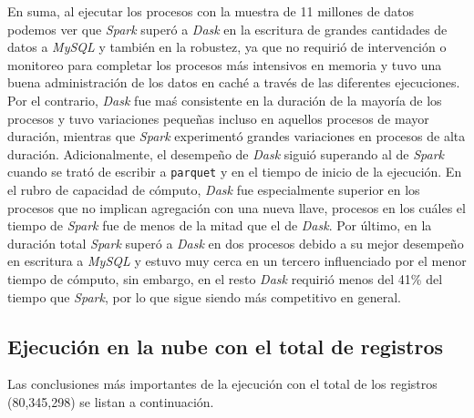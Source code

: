 En suma, al ejecutar los procesos con la muestra de 11 millones de datos podemos ver que \textit{Spark} superó a \textit{Dask} en la escritura de grandes cantidades de datos a \textit{MySQL} y también en la robustez, ya que no requirió de intervención o monitoreo para completar los procesos más intensivos en memoria y tuvo una buena administración de los datos en caché a través de las diferentes ejecuciones. Por el contrario, \textit{Dask} fue maś consistente en la duración de la mayoría de los procesos y tuvo variaciones pequeñas incluso en aquellos procesos de mayor duración, mientras que \textit{Spark} experimentó grandes variaciones en procesos de alta duración. Adicionalmente, el desempeño de \textit{Dask} siguió superando al de \textit{Spark} cuando se trató de escribir a \texttt{parquet} y en el tiempo de inicio de la ejecución. En el rubro de capacidad de cómputo, \textit{Dask} fue especialmente superior en los procesos que no implican agregación con una nueva llave, procesos en los cuáles el tiempo de \textit{Spark} fue de menos de la mitad que el de \textit{Dask}. Por último, en la duración total \textit{Spark} superó a \textit{Dask} en dos procesos debido a su mejor desempeño en escritura a \textit{MySQL} y estuvo muy cerca en un tercero influenciado por el menor tiempo de cómputo, sin embargo, en el resto \textit{Dask} requirió menos del 41\% del tiempo que \textit{Spark}, por lo que sigue siendo más competitivo en general. 



\subsection{Ejecución en la nube con el total de registros}

Las conclusiones más importantes de la ejecución con el total de los registros (80,345,298) se listan a continuación.

